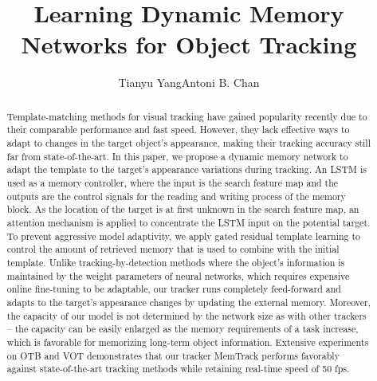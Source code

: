 \documentclass[runningheads]{llncs}
\begin{document}

\title{Learning Dynamic Memory Networks for Object Tracking} %



\author{Tianyu Yang\quad Antoni B. Chan}


\maketitle

\begin{abstract}
Template-matching methods for visual tracking have gained popularity recently due to their comparable performance and fast speed. However, they lack effective ways to adapt to changes in the target object's appearance, making their tracking accuracy still far from state-of-the-art. In this paper, we propose a dynamic memory network to adapt the template to the target's appearance variations during tracking. An LSTM is used as a memory controller, where the input is the search feature map and the outputs are the control signals for the reading and writing process of the memory block. As the location of the target is at first unknown in the search feature map, an attention mechanism is applied to concentrate the LSTM input on the potential target. To prevent aggressive model adaptivity, we apply gated residual template learning to control the amount of retrieved memory that is used to combine with the initial template. Unlike tracking-by-detection methods where the object's information is maintained by the weight parameters of neural networks, which requires expensive online fine-tuning to be adaptable, our tracker runs completely feed-forward and adapts to the target's appearance changes by updating the external memory. Moreover, the capacity of our model is not determined by the network size as with other trackers -- the capacity can be easily enlarged as the memory requirements of a task increase, which is favorable for memorizing long-term object information. Extensive experiments on OTB and VOT demonstrates that our tracker MemTrack performs favorably against state-of-the-art tracking methods while retaining real-time speed of 50 fps.

\end{abstract}
\end{document}
